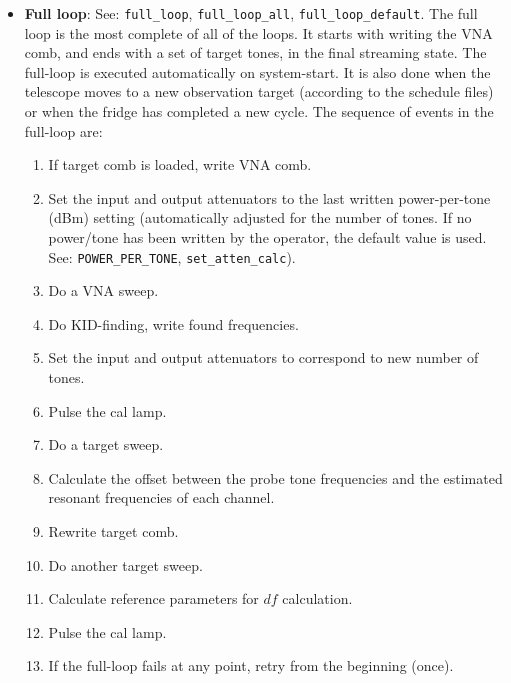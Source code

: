 \begin{itemize}[leftmargin=*,label={}]

\item \textbf{Full loop}: See: \texttt{full\_loop}, \texttt{full\_loop\_all}, \texttt{full\_loop\_default}. The full loop is the most complete of all of the loops. It starts with writing the VNA comb, and ends with a set of target tones, in the final streaming state. The full-loop is executed automatically on system-start. It is also done when the telescope moves to a new observation target (according to the schedule files) or when the fridge has completed a new cycle. The sequence of events in the full-loop are:
\begin{enumerate}
  \item If target comb is loaded, write VNA comb.
  \item Set the input and output attenuators to the last written power-per-tone (dBm) setting (automatically adjusted for the number of tones. If no power/tone has been written by the operator, the default value is used. See: \texttt{POWER\_PER\_TONE}, \texttt{set\_atten\_calc}).
  \item Do a VNA sweep.
  \item Do KID-finding, write found frequencies.
  \item Set the input and output attenuators to correspond to new number of tones.
  \item Pulse the cal lamp.
  \item Do a target sweep.
  \item Calculate the offset between the probe tone frequencies and the estimated resonant frequencies of each channel.
  \item Rewrite target comb.
  \item Do another target sweep.
  \item Calculate reference parameters for $df$ calculation.
  \item Pulse the cal lamp.
  \item If the full-loop fails at any point, retry from the beginning (once).
\end{enumerate}


\end{itemize}
